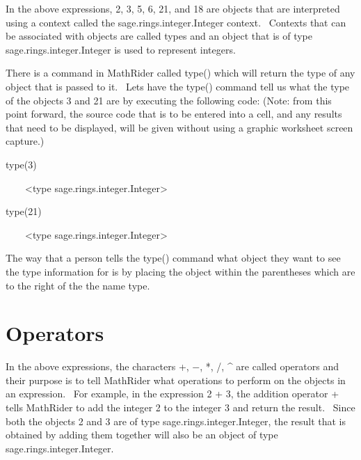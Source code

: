 \documentclass[12pt,twoside]{book}
\begin{document}
\bigskip

In the above expressions, 2, 3, 5, 6, 21, and 18 are objects that are
interpreted using a context called the sage.rings.integer.Integer
context. \ Contexts that can be associated with objects are called
types and an object that is of type sage.rings.integer.Integer is used
to represent integers.


\bigskip

There is a command in MathRider called type() which will return the type
of any object that is passed to it. \ Lets have the type() command tell
us what the type of the objects 3 and 21 are by executing the following
code: (Note: from this point forward, the source code that is to be
entered into a cell, and any results that need to be displayed, will be
given without using a graphic worksheet screen capture.)


\bigskip

type(3)

{\textbar}

\ \ \ \ {\textless}type
{\textquotesingle}sage.rings.integer.Integer{\textquotesingle}{\textgreater}


\bigskip

type(21)

{\textbar}

\ \ \ \ {\textless}type
{\textquotesingle}sage.rings.integer.Integer{\textquotesingle}{\textgreater}


\bigskip

The way that a person tells the type() command what object they want to
see the type information for is by placing the object within the
parentheses which are to the right of the the name
{\textquotesingle}type{\textquotesingle}.

\section[Operators]{Operators}

In the above expressions, the characters +, $-$, *, /, \^{} are called
operators and their purpose is to tell MathRider what operations to
perform on the objects in an expression. \ For example, in the
expression 2 + 3, the addition operator + tells MathRider to add the
integer 2 to the integer 3 and return the result. \ Since both the
objects 2 and 3 are of type sage.rings.integer.Integer, the result that
is obtained by adding them together will also be an object of type
sage.rings.integer.Integer.


\bigskip
\end{document}
